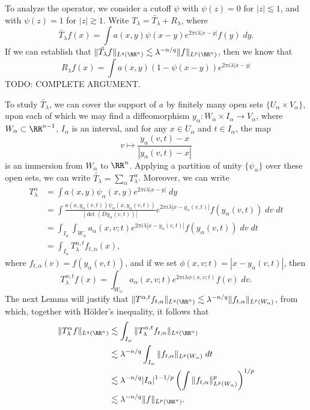 To analyze the operator, we consider a cutoff $\psi$ with $\psi(z) = 0$ for $|z| \lesssim 1$, and with $\psi(z) = 1$ for $|z| \gtrsim 1$. Write $T_\lambda = \tilde{T_\lambda} + R_\lambda$, where
%
\[ \tilde{T_\lambda} f(x) = \int a(x,y) \psi(x - y) e^{2 \pi i \lambda |x - y|} f(y)\; dy. \]
%
If we can establish that $\| \tilde{T_\lambda} f \|_{L^q(\RR^n)} \lesssim \lambda^{-n/q} \| f \|_{L^p(\RR^n)}$, then we know that
%
\[ R_\lambda f(x) = \int a(x,y) (1 - \psi(x - y)) e^{2 \pi i \lambda |x - y|} \]
%
TODO: COMPLETE ARGUMENT.

To study $\tilde{T_\lambda}$, we can cover the support of $a$ by finitely many open sets $\{ U_\alpha \times V_\alpha \}$, upon each of which we may find a diffeomorphism $y_\alpha: W_\alpha \times I_\alpha \to V_\alpha$, where $W_\alpha \subset \RR^{n-1}$, $I_\alpha$ is an interval, and for any $x \in U_\alpha$ and $t \in I_\alpha$, the map
%
\[ v \mapsto \frac{y_\alpha(v,t) - x}{|y_\alpha(v,t) - x|} \]
%
is an immersion from $W_\alpha$ to $\RR^n$. Applying a partition of unity $\{ \psi_\alpha \}$ over these open sets, we can write $\tilde{T_\lambda} = \sum_\alpha T^\alpha_{\lambda}$. Moreover, we can write
%
\begin{align*}
    T^\alpha_\lambda &= \int a(x,y) \psi_\alpha(x,y) e^{2 \pi i \lambda |x - y|}\; dy\\
    &= \int \frac{ a(x,y_\alpha(v,t)) \psi_\alpha(x,y_\alpha(v,t))}{|\det(Dy_\alpha(v,t))|} e^{2 \pi i \lambda |x - y_\alpha(v,t)|} f(y_\alpha(v,t))\; dv\; dt\\
    &= \int_{I_\alpha} \int_{W_\alpha} a_\alpha(x,v;t) e^{2 \pi i \lambda |x - y_\alpha(v,t)|} f(y_\alpha(v,t))\; dv\; dt\\
    &= \int_{I_\alpha} T^{\alpha,t}_\lambda f_{t,\alpha}(x),
\end{align*}
%
where $f_{t,\alpha}(v) = f(y_\alpha(v,t))$, and if we set $\phi(x,v;t) = |x - y_\alpha(v,t)|$, then
%
\[ T^{\alpha,t}_\lambda f(x) = \int_{W_\alpha} a_\alpha(x,v;t) e^{2 \pi i \lambda \phi(x,v;t)} f(v)\; dv. \]
%
The next Lemma will justify that $\| T^{\alpha,t} f_{t,\alpha} \|_{L^q(\RR^n)} \lesssim \lambda^{-n/q} \| f_{t,\alpha} \|_{L^p(W_\alpha)}$, from which, together with H\"{o}lder's inequality, it follows that
%
\begin{align*}
    \| T^\alpha_\lambda f \|_{L^q(\RR^n)} &\lesssim \int_{I_\alpha} \| T^{\alpha,t}_\lambda f_{t,\alpha} \|_{L^q(\RR^n)}\\
    &\lesssim \lambda^{-n/q} \int_{I_\alpha} \| f_{t,\alpha} \|_{L^p(W_\alpha)}\; dt\\
    &\lesssim \lambda^{-n/q} |I_\alpha|^{1 - 1/p} \left( \int \| f_{t,\alpha} \|_{L^p(W_\alpha)}^p \right)^{1/p}\\
    &\lesssim \lambda^{-n/q} \| f \|_{L^p(\RR^n)}.
\end{align*}
